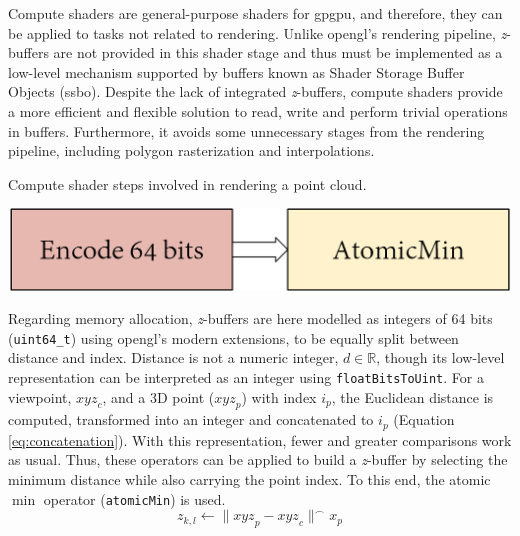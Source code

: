 Compute shaders are general-purpose shaders for \acrshort{gpgpu}, and therefore, they can be applied to tasks not related to rendering. Unlike \acrshort{opengl}'s rendering pipeline, \textit{z}-buffers are not provided in this shader stage and thus must be implemented as a low-level mechanism supported by buffers known as Shader Storage Buffer Objects (\acrshort{ssbo}). Despite the lack of integrated \textit{z}-buffers, compute shaders provide a more efficient and flexible solution to read, write and perform trivial operations in buffers. Furthermore, it avoids some unnecessary stages from the rendering pipeline, including polygon rasterization and interpolations. 

\begin{marginfigure}[.cm]
    \caption{Compute shader steps involved in rendering a point cloud.}
    \label{fig:occlusion_compute_shader_zbuffer_core}
    \includegraphics[width=\linewidth]{figs/multi_thermal_projection/occlusion_compute_shader_core.png}
\end{marginfigure}
Regarding memory allocation, \textit{z}-buffers are here modelled as integers of 64 bits (\verb|uint64_t|) using \acrshort{opengl}'s modern extensions, to be equally split between distance and index. Distance is not a numeric integer, $d \in \mathbb{R}$, though its low-level representation can be interpreted as an integer using \verb|floatBitsToUint|. For a viewpoint, $\textit{xyz}_c$, and a 3D point ($\textit{xyz}_p$) with index $i_p$, the Euclidean distance is computed, transformed into an integer and concatenated to $i_p$ (Equation \ref{eq:concatenation}). With this representation, fewer and greater comparisons work as usual. Thus, these operators can be applied to build a \textit{z}-buffer by selecting the minimum distance while also carrying the point index. To this end, the atomic $\min$ operator (\verb|atomicMin|) is used.
\begin{equation}
    \label{eq:concatenation}
    z_{k, l} \gets \lVert\textit{xyz}_p - \textit{xyz}_c\rVert ^\frown x_p
\end{equation}

